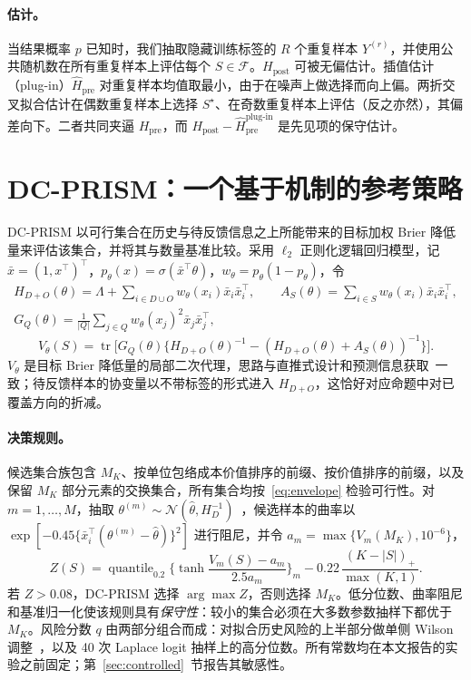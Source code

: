 \documentclass[runningheads]{llncs}
\begin{document}
\paragraph{估计。}当结果概率 $p$ 已知时，我们抽取隐藏训练标签的 $R$ 个重复样本 $Y^{(r)}$，并使用公共随机数在所有重复样本上评估每个 $S\in\mathcal F$。$H_{\mathrm{post}}$ 可被无偏估计。插值估计（plug-in）$\widehat H_{\mathrm{pre}}$ 对重复样本均值取最小，由于在噪声上做选择而向上偏。两折交叉拟合估计在偶数重复样本上选择 $S^\star$、在奇数重复样本上评估（反之亦然），其偏差向下。二者共同夹逼 $H_{\mathrm{pre}}$，而 $H_{\mathrm{post}}-\widehat H_{\mathrm{pre}}^{\text{plug-in}}$ 是先见项的保守估计。

\section{DC-PRISM：一个基于机制的参考策略}
\label{sec:policy}
DC-PRISM 以可行集合在历史与待反馈信息之上所能带来的目标加权 Brier 降低量来评估该集合，并将其与数量基准比较。采用 $\ell_2$ 正则化逻辑回归模型，记 $\bar x=(1,x^\top)^\top$，$p_\theta(x)=\sigma(\bar x^\top\theta)$，$w_\theta=p_\theta(1-p_\theta)$，令
\begin{gather*}
 H_{D+O}(\theta)=\Lambda+\!\!\sum_{i\in D\cup O}\!\!w_\theta(x_i)\bar x_i\bar x_i^\top,\qquad
 A_S(\theta)=\sum_{i\in S}w_\theta(x_i)\bar x_i\bar x_i^\top,\\
 G_Q(\theta)=\tfrac1{|Q|}\sum_{j\in Q}w_\theta(x_j)^2\bar x_j\bar x_j^\top,
\end{gather*}
\begin{equation}
 V_\theta(S)=\operatorname{tr}\!\big[G_Q(\theta)\{H_{D+O}(\theta)^{-1}-(H_{D+O}(\theta)+A_S(\theta))^{-1}\}\big].\label{eq:value}
\end{equation}
$V_\theta$ 是目标 Brier 降低量的局部二次代理，思路与直推式设计和预测信息获取~\cite{yu2006transductive,bickfordsmith2023prediction}一致；待反馈样本的协变量以不带标签的形式进入 $H_{D+O}$，这恰好对应命题中对已覆盖方向的折减。

\paragraph{决策规则。}候选集合族包含 $M_K$、按单位包络成本价值排序的前缀、按价值排序的前缀，以及保留 $M_K$ 部分元素的交换集合，所有集合均按~\eqref{eq:envelope} 检验可行性。对 $m=1,\dots,M$，抽取 $\theta^{(m)}\sim\mathcal N(\widehat\theta,H_D^{-1})$~\cite{mackay1992practical}，候选样本的曲率以 $\exp[-0.45\{\bar x_i^\top(\theta^{(m)}-\widehat\theta)\}^2]$ 进行阻尼，并令 $a_m=\max\{V_m(M_K),10^{-6}\}$，
\begin{equation}
 Z(S)=\operatorname{quantile}_{0.2}\Big\{\tanh\frac{V_m(S)-a_m}{2.5a_m}\Big\}_m-0.22\,\frac{(K-|S|)_+}{\max(K,1)} .\label{eq:score}
\end{equation}
若 $Z>0.08$，DC-PRISM 选择 $\arg\max Z$，否则选择 $M_K$。低分位数、曲率阻尼和基准归一化使该规则具有\emph{保守性}：较小的集合必须在大多数参数抽样下都优于 $M_K$。风险分数 $q$ 由两部分组合而成：对拟合历史风险的上半部分做单侧 Wilson 调整~\cite{wilson1927probable}，以及 40 次 Laplace logit 抽样上的高分位数。所有常数均在本文报告的实验之前固定；第~\ref{sec:controlled}~节报告其敏感性。
\end{document}
